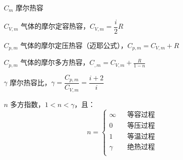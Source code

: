 \documentclass{article}
\begin{document}
\begin{enumerate}
    \item[$C_m$] 摩尔热容
    \item[$C_{V,m}$] 气体的摩尔定容热容，$C_{V,m}=\dfrac i2R$
    \item[$C_{p,m}$] 气体的摩尔定压热容（迈耶公式），$C_{p,m}=C_{V,m}+R$
    \item[$C_{p,m}$] 气体的摩尔多方热容，$C_{,m}=C_{V,m}+\frac R{1-n}$
    \item[$\gamma$] 摩尔热容比，$\gamma=\dfrac{C_{p,m}}{C_{V,m}}=\dfrac{i+2}i$
    \item[$n$] 多方指数，$1<n<\gamma$，且：
        \[n=\left\{\begin{aligned}
                \infty &  & \text{等容过程} \\
                0      &  & \text{等压过程} \\
                1      &  & \text{等温过程} \\
                \gamma &  & \text{绝热过程} \\
            \end{aligned}\right.\]
\end{enumerate}
\end{document}
